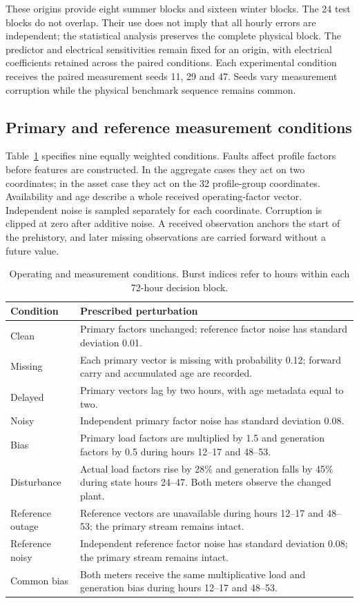 \documentclass[preprint,12pt]{elsarticle}
\begin{document}
These origins provide eight summer blocks and sixteen winter blocks. The 24 test blocks do not overlap. Their use does not imply that all hourly errors are independent; the statistical analysis preserves the complete physical block. The predictor and electrical sensitivities remain fixed for an origin, with electrical coefficients retained across the paired conditions. Each experimental condition receives the paired measurement seeds 11, 29 and 47. Seeds vary measurement corruption while the physical benchmark sequence remains common.

\subsection{Primary and reference measurement conditions}
Table~\ref{tab:conditions} specifies nine equally weighted conditions. Faults affect profile factors before features are constructed. In the aggregate cases they act on two coordinates; in the asset case they act on the 32 profile-group coordinates. Availability and age describe a whole received operating-factor vector. Independent noise is sampled separately for each coordinate. Corruption is clipped at zero after additive noise. A received observation anchors the start of the prehistory, and later missing observations are carried forward without a future value.

\begin{table}[t]
\centering\small
\caption{Operating and measurement conditions. Burst indices refer to hours within each 72-hour decision block.}\label{tab:conditions}
\begin{tabular}{>{\raggedright\arraybackslash}p{.22\linewidth}>{\raggedright\arraybackslash}p{.68\linewidth}}
\toprule Condition & Prescribed perturbation\\\midrule
Clean & Primary factors unchanged; reference factor noise has standard deviation 0.01.\\
Missing & Each primary vector is missing with probability 0.12; forward carry and accumulated age are recorded.\\
Delayed & Primary vectors lag by two hours, with age metadata equal to two.\\
Noisy & Independent primary factor noise has standard deviation 0.08.\\
Bias & Primary load factors are multiplied by 1.5 and generation factors by 0.5 during hours 12--17 and 48--53.\\
Disturbance & Actual load factors rise by 28\% and generation falls by 45\% during state hours 24--47. Both meters observe the changed plant.\\
Reference outage & Reference vectors are unavailable during hours 12--17 and 48--53; the primary stream remains intact.\\
Reference noisy & Independent reference factor noise has standard deviation 0.08; the primary stream remains intact.\\
Common bias & Both meters receive the same multiplicative load and generation bias during hours 12--17 and 48--53.\\
\bottomrule\end{tabular}
\end{table}
\end{document}
